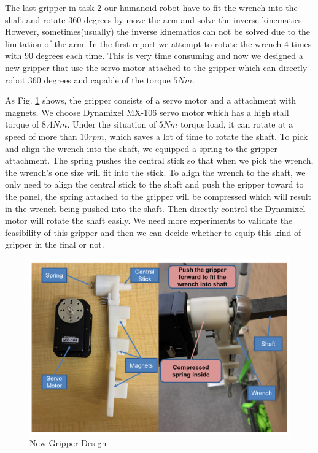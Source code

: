 \documentclass{standalone}
\begin{document}
The last gripper in task 2 our humanoid robot have to fit the wrench into the shaft and rotate $360$ degrees by move the arm and solve the inverse kinematics. However, sometimes(usually) the inverse kinematics can not be solved due to the limitation of the arm. In the first report we attempt to rotate the wrench $4$ times with $90$ degrees each time. This is very time consuming and now we designed a new gripper that use the servo motor attached to the gripper which can directly robot $360$ degrees and capable of the torque $5Nm$. 

As Fig. \ref{gripper} shows, the gripper consists of a servo motor and a attachment with magnets. We choose Dynamixel MX-106 servo motor which has a high stall torque of $8.4 Nm$. Under the situation of $5 Nm$ torque load, it can rotate at a speed of more than $10 rpm$, which saves a lot of time to rotate the shaft. To pick and align the wrench into the shaft, we equipped a spring to the gripper attachment. The spring pushes the central stick so that when we pick the wrench, the wrench's one size will fit into the stick. To align the wrench to the shaft, we only need to align the central stick to the shaft and push the gripper toward to the panel, the spring attached to the gripper will be compressed which will result in the wrench being pushed into the shaft. Then directly control the Dynamixel motor will rotate the shaft easily. We need more experiments to validate the feasibility of this gripper and then we can decide whether to equip this kind of gripper in the final or not.

 \begin{figure}%
    \begin{center}
    \includegraphics[keepaspectratio=true, width=1\linewidth, height=0.3\textheight]{sections//task2//images//gripper.png}
      \end{center}
    \caption{New Gripper Design}
    \label{gripper}
 \end{figure}
\end{document}
